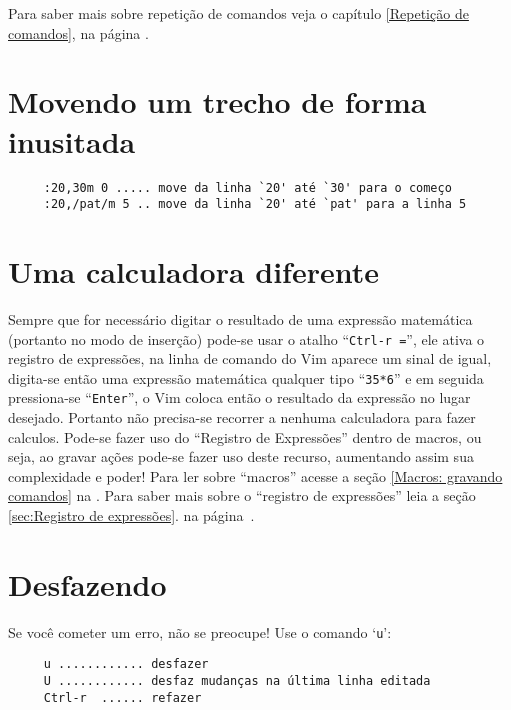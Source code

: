 {\Large {}} Para saber mais sobre repetição de comandos veja o capítulo
\ref{Repetição de comandos}, na página \pageref{Repetição de comandos}.

\section{Movendo um trecho de forma inusitada}
\label{Movendo um trecho de forma inusitada}

\begin{verbatim}
     :20,30m 0 ..... move da linha `20' até `30' para o começo
     :20,/pat/m 5 .. move da linha `20' até `pat' para a linha 5
\end{verbatim}


\section{Uma calculadora diferente}
\label{Uma calculadora diferente}

Sempre que for necessário digitar  o resultado de uma expressão matemática
(portanto no modo de inserção) pode-se usar o atalho ``{\tt Ctrl-r =}'', ele
ativa o registro de expressões, na linha de comando do Vim aparece um sinal de igual,
digita-se então uma expressão matemática qualquer tipo ``{\tt 35*6}'' e em
seguida pressiona-se ``{\tt Enter}'', o Vim coloca então o resultado da
expressão no lugar desejado.  Portanto não precisa-se recorrer a nenhuma
calculadora para fazer calculos.  Pode-se fazer uso do ``Registro de
Expressões'' dentro de macros, ou seja, ao gravar ações pode-se fazer uso deste
recurso, aumentando assim sua complexidade e poder! Para ler sobre ``macros''
acesse a seção \ref{Macros: gravando comandos} na \pageref{Macros: gravando
comandos}.  Para saber mais sobre o ``registro de expressões'' leia a seção
\ref{sec:Registro de expressões}.  na página~\pageref{sec:Registro de
expressões}.

\section{Desfazendo}
\label{Desfazendo}

Se você cometer um erro, não se preocupe! Use o comando `{\tt u}':

\begin{verbatim}
     u ............ desfazer
     U ............ desfaz mudanças na última linha editada
     Ctrl-r  ...... refazer
\end{verbatim}

